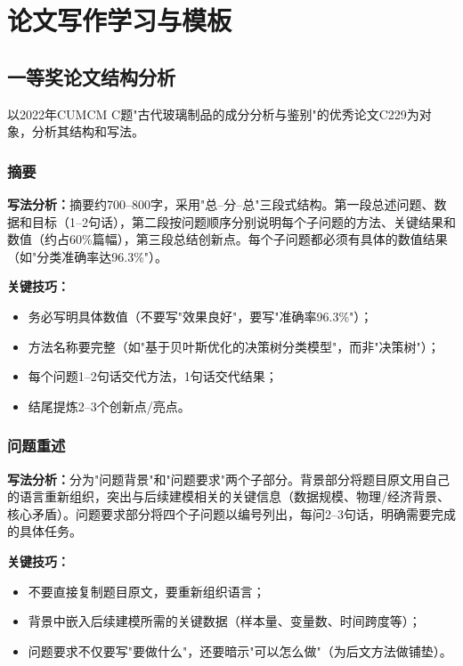\documentclass[12pt,a4paper]{ctexart}
\begin{document}
\newpage

\section{论文写作学习与模板}

\subsection{一等奖论文结构分析}

以2022年CUMCM C题"古代玻璃制品的成分分析与鉴别"的优秀论文C229为对象，分析其结构和写法。

\subsubsection{摘要}

\textbf{写法分析：}摘要约700--800字，采用"总--分--总"三段式结构。第一段总述问题、数据和目标（1--2句话），第二段按问题顺序分别说明每个子问题的方法、关键结果和数值（约占60\%篇幅），第三段总结创新点。每个子问题都必须有具体的数值结果（如"分类准确率达96.3\%"）。

\textbf{关键技巧：}
\begin{itemize}[leftmargin=*]
    \item 务必写明具体数值（不要写"效果良好"，要写"准确率96.3\%"）；
    \item 方法名称要完整（如"基于贝叶斯优化的决策树分类模型"，而非"决策树"）；
    \item 每个问题1--2句话交代方法，1句话交代结果；
    \item 结尾提炼2--3个创新点/亮点。
\end{itemize}

\subsubsection{问题重述}

\textbf{写法分析：}分为"问题背景"和"问题要求"两个子部分。背景部分将题目原文用自己的语言重新组织，突出与后续建模相关的关键信息（数据规模、物理/经济背景、核心矛盾）。问题要求部分将四个子问题以编号列出，每问2--3句话，明确需要完成的具体任务。

\textbf{关键技巧：}
\begin{itemize}[leftmargin=*]
    \item 不要直接复制题目原文，要重新组织语言；
    \item 背景中嵌入后续建模所需的关键数据（样本量、变量数、时间跨度等）；
    \item 问题要求不仅要写"要做什么"，还要暗示"可以怎么做"（为后文方法做铺垫）。
\end{itemize}
\end{document}
